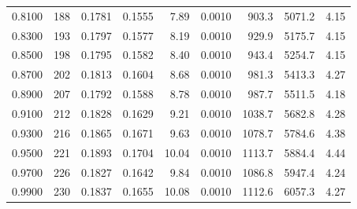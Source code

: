 {\begin{longtable}{lrrrrrrrr}
  0.8100 & 188 & 0.1781 & 0.1555 & 7.89 & 0.0010 & 903.3 & 5071.2 & 4.15 \\
  0.8300 & 193 & 0.1797 & 0.1577 & 8.19 & 0.0010 & 929.9 & 5175.7 & 4.15 \\
  0.8500 & 198 & 0.1795 & 0.1582 & 8.40 & 0.0010 & 943.4 & 5254.7 & 4.15 \\
  0.8700 & 202 & 0.1813 & 0.1604 & 8.68 & 0.0010 & 981.3 & 5413.3 & 4.27 \\
  0.8900 & 207 & 0.1792 & 0.1588 & 8.78 & 0.0010 & 987.7 & 5511.5 & 4.18 \\
  0.9100 & 212 & 0.1828 & 0.1629 & 9.21 & 0.0010 & 1038.7 & 5682.8 & 4.28 \\
  0.9300 & 216 & 0.1865 & 0.1671 & 9.63 & 0.0010 & 1078.7 & 5784.6 & 4.38 \\
  0.9500 & 221 & 0.1893 & 0.1704 & 10.04 & 0.0010 & 1113.7 & 5884.4 & 4.44 \\
  0.9700 & 226 & 0.1827 & 0.1642 & 9.84 & 0.0010 & 1086.8 & 5947.4 & 4.24 \\
  0.9900 & 230 & 0.1837 & 0.1655 & 10.08 & 0.0010 & 1112.6 & 6057.3 & 4.27 \\
\end{longtable}
}
